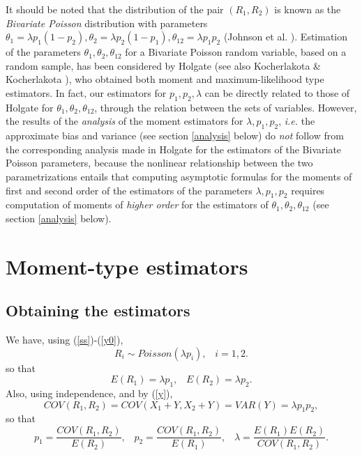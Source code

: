\documentclass[a4paper,10pt,twoside]{article}
\begin{document}
It should be noted that the distribution of the pair $(R_1,R_2)$ is known as the {\it{Bivariate Poisson}}
distribution with parameters $\theta_1=\lambda p_1(1-p_2),\theta_2=\lambda p_2(1-p_1),\theta_{12}= \lambda p_1p_2$ (Johnson et al. \cite{johnson}).
Estimation of the parameters $\theta_1,\theta_2,\theta_{12}$ for a Bivariate Poisson random variable, based on a 
random sample, has been considered by Holgate \cite{holgate} (see also Kocherlakota \& Kocherlakota \cite{kocherlakota}), who obtained both moment and maximum-likelihood type estimators.
In fact, our estimators for $p_1,p_2,\lambda$ can be directly related to those of Holgate for $\theta_1,\theta_2,\theta_{12}$,
through the relation between the sets of variables. However, the results of the {\it{analysis}} of the moment estimators for $\lambda,p_1,p_2$, {\it{i.e.}} 
the approximate bias and variance (see section \ref{analysis} below) do {\it{not}} follow from the corresponding analysis made in Holgate \cite{holgate}
for the estimators of the Bivariate Poisson parameters, because the nonlinear relationship between the two parametrizations entails 
that computing asymptotic formulas for the moments of first and second order of the estimators of the parameters $\lambda,p_1,p_2$ requires 
computation of moments of {\it{higher order}} for the estimators of $\theta_1,\theta_2,\theta_{12}$ (see section \ref{analysis} below).



\section{Moment-type estimators}
\label{moment}

\subsection{Obtaining the estimators}


We have, using (\ref{ss})-(\ref{y0}),
$$R_{i}\sim Poisson(\lambda p_i),\;\;\; i=1,2.$$
so that
$$E(R_{1})= \lambda p_1,\;\;\;E(R_{2})= \lambda p_2.$$
Also, using independence, and by (\ref{y}),
$$COV(R_{1},R_{2})=COV\left( X_{1}+Y,X_{2}+Y\right)= VAR(Y)=\lambda p_1 p_2,$$
so that
$$p_1=\frac{COV(R_{1},R_{2})}{E(R_{2})},\;\;\; p_2=\frac{COV(R_{1},R_{2})}{E(R_{1})},\;\;\;\lambda= \frac{E(R_{1})E(R_{2})}{COV(R_{1},R_{2})}.$$
\end{document}
